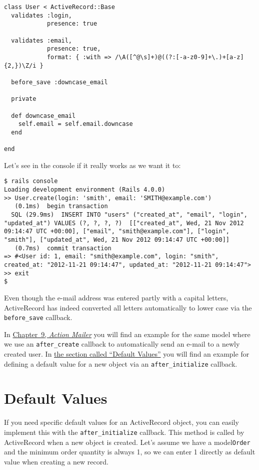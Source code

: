 \documentclass[a4paper]{book}
\newcommand{\chap}[1]{\newpage\thispagestyle{empty}\chapter{#1}\label{chap:\thechapter}}
\begin{document}
\begin{shaded}\begin{verbatim}
class User < ActiveRecord::Base
  validates :login,
            presence: true

  validates :email,
            presence: true,
            format: { :with => /\A([^@\s]+)@((?:[-a-z0-9]+\.)+[a-z]{2,})\Z/i }

  before_save :downcase_email

  private

  def downcase_email
    self.email = self.email.downcase
  end

end
\end{verbatim}\end{shaded}

Let's see in the console if it really works as we want it to:

\begin{shaded}\begin{verbatim}
$ rails console
Loading development environment (Rails 4.0.0)
>> User.create(login: 'smith', email: 'SMITH@example.com')
   (0.1ms)  begin transaction
  SQL (29.9ms)  INSERT INTO "users" ("created_at", "email", "login", "updated_at") VALUES (?, ?, ?, ?)  [["created_at", Wed, 21 Nov 2012 09:14:47 UTC +00:00], ["email", "smith@example.com"], ["login", "smith"], ["updated_at", Wed, 21 Nov 2012 09:14:47 UTC +00:00]]
   (0.7ms)  commit transaction
=> #<User id: 1, email: "smith@example.com", login: "smith", created_at: "2012-11-21 09:14:47", updated_at: "2012-11-21 09:14:47">
>> exit
$
\end{verbatim}\end{shaded}

Even though the e-mail address was entered partly with a capital letters, ActiveRecord has indeed converted all letters automatically to lower case via the \texttt{before\_save} callback.

In \hyperref[actionux5fmailer]{Chapter~9, \emph{Action Mailer}} you will find an example for the same model where we use an \texttt{after\_create} callback to automatically send an e-mail to a newly created user. In \hyperref[arux5fdefaultux5fwerte]{the section called “Default Values”} you will find an example for defining a default value for a new object via an \texttt{after\_initialize} callback.

\chap{Default Values}\label{default-values}

If you need specific default values for an ActiveRecord object, you can easily implement this with the \texttt{after\_initialize} callback. This method is called by ActiveRecord when a new object is created. Let's assume we have a model\texttt{Order} and the minimum order quantity is always 1, so we can enter 1 directly as default value when creating a new record.
\end{document}
